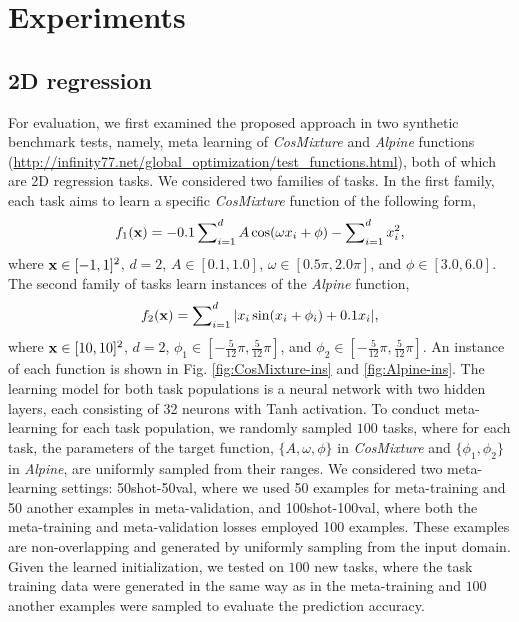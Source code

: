 \section{Experiments}
\subsection{2D regression}\label{sect:syn}
\vspace{-0.05in}
For evaluation, we first examined the proposed approach in two synthetic benchmark tests, namely, meta learning of \textit{CosMixture} and \textit{Alpine} functions ({\url{http://infinity77.net/global_optimization/test_functions.html}}), both of which are 2D regression tasks. We considered two families of tasks. In the first family, each task aims to learn a specific \textit{CosMixture} function of the following form,
\begin{align}
	f_1({\bf x}) = -0.1 \sum\nolimits_{i=1}^d A \cos(\omega x_i + \phi) - \sum\nolimits_{i=1}^d x_i^2,
\end{align}
where ${\bf x} \in [-1, 1]^2$, $d =2$, $A \in [0.1, 1.0]$, $\omega \in [0.5 \pi, 2.0\pi]$, and $\phi \in [3.0, 6.0]$. 
The second family of tasks learn instances of the \textit{Alpine} function,  
\begin{align}
	f_2({\bf x}) = \sum\nolimits_{i=1}^d |x_i \sin(x_i + \phi_i) + 0.1x_i|,
\end{align}
where ${\bf x} \in [10, 10]^2$, $d=2$, $\phi_1 \in [-\frac{5}{12}\pi, \frac{5}{12}\pi]$, and $\phi_2 \in [-\frac{5}{12}\pi, \frac{5}{12}\pi]$.   An instance of each function is shown in Fig. \ref{fig:CosMixture-ins} and \ref{fig:Alpine-ins}. The learning model for both task populations is a neural network with two hidden layers, each consisting of 32 neurons with  Tanh activation. %
To conduct meta-learning for each task population, we randomly sampled $100$ tasks, where for each task, the parameters of the target function, \ie $\{A, \omega, \phi\}$ in \textit{CosMixture} and $\{\phi_1, \phi_2\}$ in \textit{Alpine}, are uniformly sampled from their ranges. We considered two meta-learning settings: 50shot-50val, where we used 50 examples for meta-training and 50 another examples in meta-validation, and 100shot-100val, where both the meta-training and meta-validation losses employed 100 examples.  These examples are non-overlapping and generated by uniformly sampling from the input domain. Given the learned initialization, we tested on $100$ new tasks, where the task training data were generated in the same way as in the meta-training and $100$ another examples were sampled to evaluate the prediction accuracy. 

